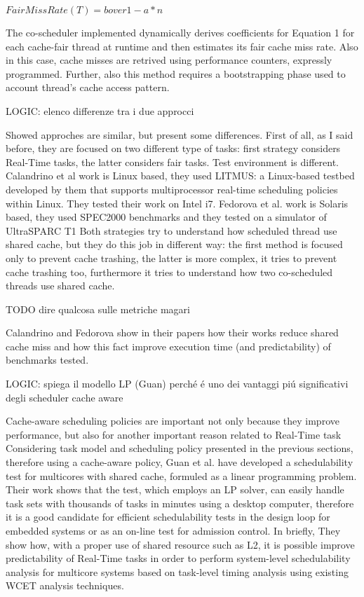 \documentclass[a4paper,10pt]{article}
\begin{document}
\begin{multicols}{2}
	$FairMissRate(T) = b over 1 - a*n$

The co-scheduler implemented dynamically derives coefficients for Equation 1 for each cache-fair thread at runtime and then estimates its fair cache 
miss rate. Also in this case, cache misses are retrived using performance counters, expressly programmed. Further, also this method requires a 
bootstrapping phase used to account thread's cache access pattern. 

LOGIC: elenco differenze tra i due approcci

Showed approches are similar, but present some differences.
First of all, as I said before, they are focused on two different type of tasks: first strategy considers Real-Time tasks, 
the latter considers fair tasks.
Test environment is different. Calandrino et al work is Linux based, they used LITMUS: a Linux-based testbed developed by them that 
supports multiprocessor real-time scheduling policies within Linux. They tested their work on Intel i7.
Fedorova et al. work is Solaris based, they used SPEC2000 benchmarks and they tested on a simulator of UltraSPARC T1
Both strategies try to understand how scheduled thread use shared cache, but they do this job in different way: the first method is focused only
to prevent cache trashing, the latter is more complex, it tries to prevent cache trashing too, furthermore it tries to understand how two co-scheduled
threads use shared cache.

TODO dire qualcosa sulle metriche magari

Calandrino and Fedorova show in their papers how their works reduce shared cache miss and how this fact improve execution time (and predictability) 
of benchmarks tested.

LOGIC: spiega il modello LP (Guan) perch\'e \'e uno dei vantaggi pi\'u significativi degli scheduler cache aware

Cache-aware scheduling policies are important not only because they improve performance, but also for another important reason related to Real-Time task
Considering task model and scheduling policy presented in the previous sections, therefore using a cache-aware policy, Guan et al. have developed a 
schedulability test for multicores with shared cache, formuled as a linear programming problem.
Their work shows that the test, which employs an LP solver, can easily handle task sets with thousands of tasks in minutes using a 
desktop computer, therefore it is a good candidate for efficient schedulability tests in the design loop for embedded systems or as an
on-line test for admission control.
In briefly, They show how, with a proper use of shared resource such as L2, it is possible improve predictability
of Real-Time tasks in order to perform system-level schedulability analysis for multicore systems based on task-level timing analysis using
existing WCET analysis techniques.




\end{multicols}
\end{document}
